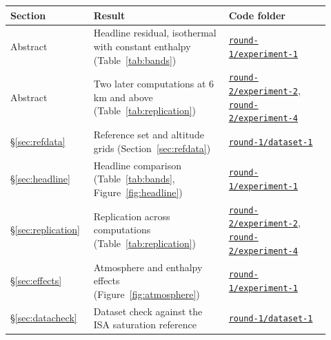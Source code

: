 \documentclass[11pt,letterpaper]{article}
\begin{document}
\begin{longtable}{p{0.22\linewidth} p{0.40\linewidth} p{0.30\linewidth}}
  \toprule
  Section & Result & Code folder \\
  \midrule
  \endhead
  Abstract & Headline residual, isothermal with constant enthalpy (Table~\ref{tab:bands}) & \href{https://github.com/ai-inventor-papers/ai-invention-fde7b3-simple-barometric-model-vs-boiling-point/tree/main/round-1/experiment-1}{\texttt{round-1/experiment-1}} \\
  Abstract & Two later computations at 6 km and above (Table~\ref{tab:replication}) & \href{https://github.com/ai-inventor-papers/ai-invention-fde7b3-simple-barometric-model-vs-boiling-point/tree/main/round-2/experiment-2}{\texttt{round-2/experiment-2}}, \href{https://github.com/ai-inventor-papers/ai-invention-fde7b3-simple-barometric-model-vs-boiling-point/tree/main/round-2/experiment-4}{\texttt{round-2/experiment-4}} \\
  \S\ref{sec:refdata} & Reference set and altitude grids (Section~\ref{sec:refdata}) & \href{https://github.com/ai-inventor-papers/ai-invention-fde7b3-simple-barometric-model-vs-boiling-point/tree/main/round-1/dataset-1}{\texttt{round-1/dataset-1}} \\
  \S\ref{sec:headline} & Headline comparison (Table~\ref{tab:bands}, Figure~\ref{fig:headline}) & \href{https://github.com/ai-inventor-papers/ai-invention-fde7b3-simple-barometric-model-vs-boiling-point/tree/main/round-1/experiment-1}{\texttt{round-1/experiment-1}} \\
  \S\ref{sec:replication} & Replication across computations (Table~\ref{tab:replication}) & \href{https://github.com/ai-inventor-papers/ai-invention-fde7b3-simple-barometric-model-vs-boiling-point/tree/main/round-2/experiment-2}{\texttt{round-2/experiment-2}}, \href{https://github.com/ai-inventor-papers/ai-invention-fde7b3-simple-barometric-model-vs-boiling-point/tree/main/round-2/experiment-4}{\texttt{round-2/experiment-4}} \\
  \S\ref{sec:effects} & Atmosphere and enthalpy effects (Figure~\ref{fig:atmosphere}) & \href{https://github.com/ai-inventor-papers/ai-invention-fde7b3-simple-barometric-model-vs-boiling-point/tree/main/round-1/experiment-1}{\texttt{round-1/experiment-1}} \\
  \S\ref{sec:datacheck} & Dataset check against the ISA saturation reference & \href{https://github.com/ai-inventor-papers/ai-invention-fde7b3-simple-barometric-model-vs-boiling-point/tree/main/round-1/dataset-1}{\texttt{round-1/dataset-1}} \\

\end{longtable}
\end{document}
